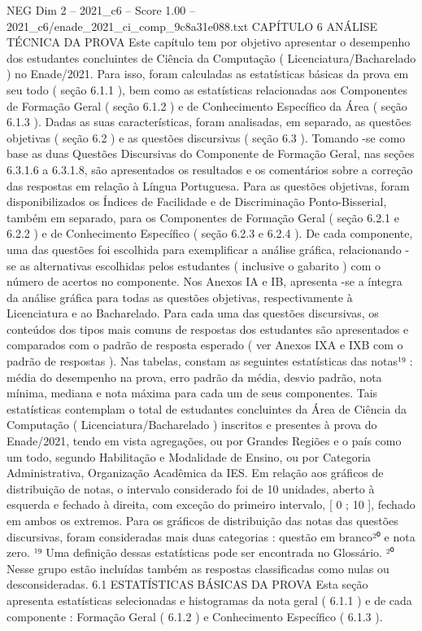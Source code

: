 \begin{textsample}{NEG Dim 2 – 2021\_c6 – Score 1.00 – 2021\_c6/enade\_2021\_ci\_comp\_9c8a31e088.txt}  \label{ex:f2_neg_256}
CAPÍTULO 6 ANÁLISE TÉCNICA DA PROVA Este capítulo tem por objetivo apresentar o desempenho dos estudantes concluintes de Ciência da Computação ( Licenciatura/Bacharelado ) no Enade/2021.
Para isso, foram calculadas as estatísticas básicas da prova em seu todo ( seção 6.1.1 ), bem como as estatísticas relacionadas aos Componentes de Formação Geral ( seção 6.1.2 ) e de Conhecimento Específico da Área ( seção 6.1.3 ).
Dadas as suas características, foram analisadas, em separado, as questões objetivas ( seção 6.2 ) e as questões discursivas ( seção 6.3 ).
Tomando -se como base as duas Questões Discursivas do Componente de Formação Geral, nas seções 6.3.1.6 a 6.3.1.8, são apresentados os resultados e os comentários sobre a correção das respostas em relação à Língua Portuguesa.
Para as questões objetivas, foram disponibilizados os Índices de Facilidade e de Discriminação Ponto-Bisserial, também em separado, para os Componentes de Formação Geral ( seção 6.2.1 e 6.2.2 ) e de Conhecimento Específico ( seção 6.2.3 e 6.2.4 ).
De cada componente, uma das questões foi escolhida para exemplificar a análise gráfica, relacionando -se as alternativas escolhidas pelos estudantes ( inclusive o gabarito ) com o número de acertos no componente.
Nos Anexos IA e IB, apresenta -se a íntegra da análise gráfica para todas as questões objetivas, respectivamente à Licenciatura e ao Bacharelado.
Para cada uma das questões discursivas, os conteúdos dos tipos mais comuns de respostas dos estudantes são apresentados e comparados com o padrão de resposta esperado ( ver Anexos IXA e IXB com o padrão de respostas ).
Nas tabelas, constam as seguintes estatísticas das notas¹⁹ : média do desempenho na prova, erro padrão da média, desvio padrão, nota mínima, mediana e nota máxima para cada um de seus componentes.
Tais estatísticas contemplam o total de estudantes concluintes da Área de Ciência da Computação ( Licenciatura/Bacharelado ) inscritos e presentes à prova do Enade/2021, tendo em vista agregações, ou por Grandes Regiões e o país como um todo, segundo Habilitação e Modalidade de Ensino, ou por Categoria Administrativa, Organização Acadêmica da IES.
Em relação aos gráficos de distribuição de notas, o intervalo considerado foi de 10 unidades, aberto à esquerda e fechado à direita, com exceção do primeiro intervalo, [ 0 ; 10 ], fechado em ambos os extremos.
Para os gráficos de distribuição das notas das questões discursivas, foram consideradas mais duas categorias : questão em branco²⁰ e nota zero. ¹⁹ Uma definição dessas estatísticas pode ser encontrada no Glossário. ²⁰ Nesse grupo estão incluídas também as respostas classificadas como nulas ou desconsideradas. 6.1 ESTATÍSTICAS BÁSICAS DA PROVA Esta seção apresenta estatísticas selecionadas e histogramas da nota geral ( 6.1.1 ) e de cada componente : Formação Geral ( 6.1.2 ) e Conhecimento Específico ( 6.1.3 ).

\end{textsample}
